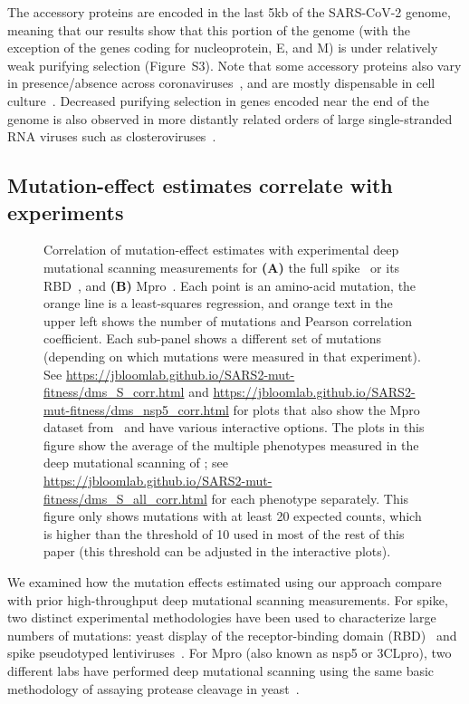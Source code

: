 \documentclass[9pt,twocolumn,twoside]{gsajnl_modified}
\begin{document}
The accessory proteins are encoded in the last 5kb of the SARS-CoV-2 genome, meaning that our results show that this portion of the genome (with the exception of the genes coding for nucleoprotein, E, and M) is under relatively weak purifying selection (Figure~S3).
Note that some accessory proteins also vary in presence/absence across coronaviruses~\citep{v2021coronavirus,llanes2020betacoronavirus}, and are mostly dispensable in cell culture~\citep{mcgrath2022sars,silvas2021contribution,liu2022live,liu2014accessory}.
Decreased purifying selection in genes encoded near the end of the genome is also observed in more distantly related orders of large single-stranded RNA viruses such as closteroviruses~\citep{wang2011genetic, dawson2013virus}.

\subsection*{Mutation-effect estimates correlate with experiments}

\begin{figure}
\centering
\caption{
Correlation of mutation-effect estimates with experimental deep mutational scanning measurements for {\bf (A)} the full spike~\citep{dadonaite2023pseudovirus} or its RBD~\citep{starr2022deep}, and {\bf (B)} Mpro~\citep{flynn2023,iketani2022functional}.
Each point is an amino-acid mutation, the orange line is a least-squares regression, and orange text in the upper left shows the number of mutations and Pearson correlation coefficient.
Each sub-panel shows a different set of mutations (depending on which mutations were measured in that experiment).
See \url{https://jbloomlab.github.io/SARS2-mut-fitness/dms_S_corr.html} and \url{https://jbloomlab.github.io/SARS2-mut-fitness/dms_nsp5_corr.html} for plots that also show the Mpro dataset from~\citep{flynn2022} and have various interactive options.
The plots in this figure show the average of the multiple phenotypes measured in the deep mutational scanning of \cite{starr2022deep}; see \url{https://jbloomlab.github.io/SARS2-mut-fitness/dms_S_all_corr.html} for each phenotype separately.
This figure only shows mutations with at least 20 expected counts, which is higher than the threshold of 10 used in most of the rest of this paper (this threshold can be adjusted in the interactive plots).
\label{fig:dms}
}
\end{figure}

We examined how the mutation effects estimated using our approach compare with prior high-throughput deep mutational scanning measurements.
For spike, two distinct experimental methodologies have been used to characterize large numbers of mutations: yeast display of the receptor-binding domain (RBD)~\citep{starr2020deep,starr2022deep} and spike pseudotyped lentiviruses~\citep{dadonaite2023pseudovirus}.
For Mpro (also known as nsp5 or 3CLpro), two different labs have performed deep mutational scanning using the same basic methodology of assaying protease cleavage in yeast~\citep{flynn2022,flynn2023,iketani2022functional}.
\end{document}
